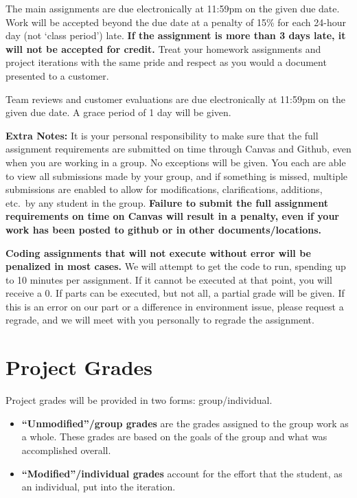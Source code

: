 \documentclass[11pt]{article}
\begin{document}
The main assignments are due electronically at 11:59pm on the given due date. Work will be accepted beyond the due date at a penalty of 15\% for each 24-hour day (not `class period') late. \textbf{If the assignment is more than 3 days late, it will not be accepted for credit.} Treat your homework assignments and project iterations with the same pride and respect as you would a document presented to a customer.

Team reviews and customer evaluations are due electronically at 11:59pm on the given due date. A grace period of 1 day will be given.

\textbf{Extra Notes:} It is your personal responsibility to make sure that the full assignment requirements are submitted on time through Canvas and Github, even when you are working in a group. No exceptions will be given. You each are able to view all submissions made by your group, and if something is missed, multiple submissions are enabled to allow for modifications, clarifications, additions, etc.\ by any student in the group. \textbf{Failure to submit the full assignment requirements on time on Canvas will result in a penalty, even if your work has been posted to github or in other documents/locations.}

\textbf{Coding assignments that will not execute without error will be penalized in most cases.} We will attempt to get the code to run, spending up to 10 minutes per assignment. If it cannot be executed at that point, you will receive a 0. If parts can be executed, but not all, a partial grade will be given. If this is an error on our part or a difference in environment issue, please request a regrade, and we will meet with you personally to regrade the assignment.

\section*{Project Grades}

Project grades will be provided in two forms: group/individual.

\begin{itemize}
    \item \textbf{``Unmodified''/group grades} are the grades assigned to the group work as a whole. These grades are based on the goals of the group and what was accomplished overall.
    \item \textbf{``Modified''/individual grades} account for the effort that the student, as an individual, put into the iteration.
\end{itemize}
\end{document}
